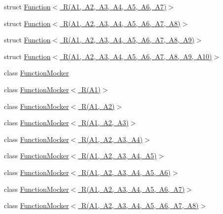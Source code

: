 \begin{DoxyCompactItemize}
\item 
struct \mbox{\hyperlink{structtesting_1_1internal_1_1Function_3_01R_07A1_00_01A2_00_01A3_00_01A4_00_01A5_00_01A6_00_01A7_08_4}{Function$<$ R(\+A1, A2, A3, A4, A5, A6, A7)$>$}}
\item 
struct \mbox{\hyperlink{structtesting_1_1internal_1_1Function_3_01R_07A1_00_01A2_00_01A3_00_01A4_00_01A5_00_01A6_00_01A7_00_01A8_08_4}{Function$<$ R(\+A1, A2, A3, A4, A5, A6, A7, A8)$>$}}
\item 
struct \mbox{\hyperlink{structtesting_1_1internal_1_1Function_3_01R_07A1_00_01A2_00_01A3_00_01A4_00_01A5_00_01A6_00_01A7_00_01A8_00_01A9_08_4}{Function$<$ R(\+A1, A2, A3, A4, A5, A6, A7, A8, A9)$>$}}
\item 
struct \mbox{\hyperlink{structtesting_1_1internal_1_1Function_3_01R_07A1_00_01A2_00_01A3_00_01A4_00_01A5_00_01A6_00_01A7_00_01A8_00_01A9_00_01A10_08_4}{Function$<$ R(\+A1, A2, A3, A4, A5, A6, A7, A8, A9, A10)$>$}}
\item 
class \mbox{\hyperlink{classtesting_1_1internal_1_1FunctionMocker}{Function\+Mocker}}
\item 
class \mbox{\hyperlink{classtesting_1_1internal_1_1FunctionMocker_3_01R_07A1_08_4}{Function\+Mocker$<$ R(\+A1)$>$}}
\item 
class \mbox{\hyperlink{classtesting_1_1internal_1_1FunctionMocker_3_01R_07A1_00_01A2_08_4}{Function\+Mocker$<$ R(\+A1, A2)$>$}}
\item 
class \mbox{\hyperlink{classtesting_1_1internal_1_1FunctionMocker_3_01R_07A1_00_01A2_00_01A3_08_4}{Function\+Mocker$<$ R(\+A1, A2, A3)$>$}}
\item 
class \mbox{\hyperlink{classtesting_1_1internal_1_1FunctionMocker_3_01R_07A1_00_01A2_00_01A3_00_01A4_08_4}{Function\+Mocker$<$ R(\+A1, A2, A3, A4)$>$}}
\item 
class \mbox{\hyperlink{classtesting_1_1internal_1_1FunctionMocker_3_01R_07A1_00_01A2_00_01A3_00_01A4_00_01A5_08_4}{Function\+Mocker$<$ R(\+A1, A2, A3, A4, A5)$>$}}
\item 
class \mbox{\hyperlink{classtesting_1_1internal_1_1FunctionMocker_3_01R_07A1_00_01A2_00_01A3_00_01A4_00_01A5_00_01A6_08_4}{Function\+Mocker$<$ R(\+A1, A2, A3, A4, A5, A6)$>$}}
\item 
class \mbox{\hyperlink{classtesting_1_1internal_1_1FunctionMocker_3_01R_07A1_00_01A2_00_01A3_00_01A4_00_01A5_00_01A6_00_01A7_08_4}{Function\+Mocker$<$ R(\+A1, A2, A3, A4, A5, A6, A7)$>$}}
\item 
class \mbox{\hyperlink{classtesting_1_1internal_1_1FunctionMocker_3_01R_07A1_00_01A2_00_01A3_00_01A4_00_01A5_00_01A6_00_01A7_00_01A8_08_4}{Function\+Mocker$<$ R(\+A1, A2, A3, A4, A5, A6, A7, A8)$>$}}

\end{DoxyCompactItemize}
